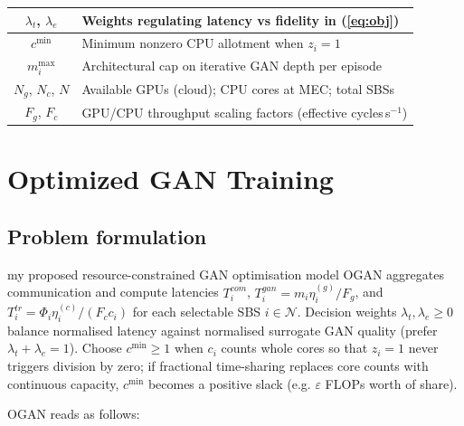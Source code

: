 \documentclass[letterpaper%
, twoside%
, 12pt%
,memoire%
, english%
,creativecommons,hyperref, withAlgo2e %
]{thETS}
\numberwithin{algorithm}{chapter}
\begin{document}
\begin{table}[htp]
\begin{tabular}{|c|l|}
\hline
$\lambda_t$, $\lambda_e$ & Weights regulating latency vs fidelity in (\ref{eq:obj}) \\
\hline
$c^{\min}$ & Minimum nonzero CPU allotment when \(z_i=1\) \\
\hline
$m_i^{\max}$ & Architectural cap on iterative GAN depth per episode \\
\hline
$N_g$, $N_c$, $N$ & Available GPUs (cloud); CPU cores at MEC; total SBSs \\
\hline
$F_g$, $F_c$ & GPU/CPU throughput scaling factors (effective cycles\,s\(^{-1}\)) \\
\hline
\end{tabular}
\end{table}




\section{Optimized GAN Training}\label{sec:ogan}






\subsection{Problem formulation}\label{prob_formulation}




 my proposed resource-constrained GAN optimisation model OGAN aggregates communication and compute latencies \(T_i^{com}\), \(T_i^{gan}=m_i\eta_i^{(g)}/F_g\), and \(T_i^{tr}=\Phi_i\eta_i^{(c)}/(F_c c_i)\) for each selectable SBS \(i\in\mathcal{N}\). Decision weights \(\lambda_t,\lambda_e\geq 0\) balance normalised latency against normalised surrogate GAN quality (prefer \(\lambda_t+\lambda_e=1\)). Choose \(c^{\min}\geq 1\) when \(c_i\) counts whole cores so that \(z_i=1\) never triggers division by zero; if fractional time-sharing replaces core counts with continuous capacity, \(c^{\min}\) becomes a positive slack (e.g. \(\varepsilon\) FLOPs worth of share).

OGAN reads as follows:  
\end{document}
